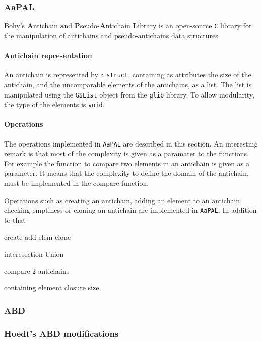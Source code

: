 \documentclass[letterpaper]{article}
\theoremstyle{definition}
\begin{document}
\subsubsection{AaPAL}

Bohy's \textbf{A}ntichain
\textbf{a}nd \textbf{P}seudo-\textbf{A}ntichain \textbf{L}ibrary \cite{aapal}
is an open-source \texttt{C} library for the manipulation
of antichains and pseudo-antichains data structures.


\paragraph{Antichain representation}

An antichain is represented by a \texttt{struct}, containing as attributes
the size of the antichain, and the uncomparable elements of the antichains,
as a list. The list is manipulated using the \texttt{GSList} object
from the \texttt{glib} library. To allow modularity, the type of the elements
is \texttt{void}.

\paragraph{Operations}

The operations implemented in \texttt{AaPAL}
are described in this section.
An interesting remark is that most of the complexity is given as a paramater
to the functions. For example the function to compare two elements in
an antichain is given as a parameter. It means that the complexity to define
the domain of the antichain, must be implemented in the compare function.

Operations such as creating an antichain,
adding an element to
an antichain, checking emptiness or cloning an antichain are implemented
in \texttt{AaPAL}. In addition to that

create
add elem
clone

interesection
Union

compare 2 antichains

containing element
closure size



\subsubsection{ABD}

\subsubsection{Hoedt's ABD modifications}
\end{document}
